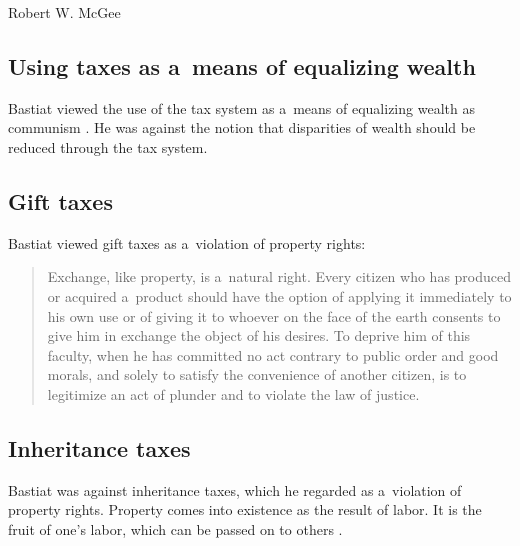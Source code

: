 \begin{artengenv}{Robert W. McGee}
\subsection{Using taxes as a~means of equalizing wealth}



Bastiat viewed the use of the tax system as a~means of equalizing wealth as communism 
\parencite[][p.111]{bastiat_selected_1964}. %
 He was against the notion that disparities of wealth should be reduced through the tax system.



\subsection{Gift taxes}



Bastiat viewed gift taxes as a~violation of property rights:



\begin{quote}
Exchange, like property, is a~natural right. Every citizen who has produced or acquired a~product should have the option of applying it immediately to his own use or of giving it to whoever on the face of the earth consents to give him in exchange the object of his desires. To deprive him of this faculty, when he has committed no act contrary to public order and good morals, and solely to satisfy the convenience of another citizen, is to legitimize an act of plunder and to violate the law of justice. 
\parencite[][p.112]{bastiat_selected_1964}%
\end{quote}




\subsection{Inheritance taxes}



Bastiat was against inheritance taxes, which he regarded as a~violation of property rights. Property comes into existence as the result of labor. It is the fruit of one's labor, which can be passed on to others 
\parencite[][pp.188–193]{bastiat_selected_1964}.%





\end{artengenv}
